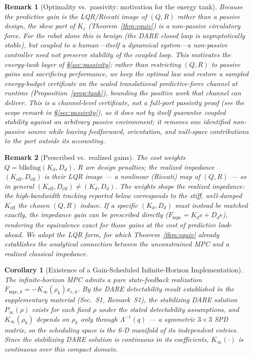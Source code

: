 \documentclass[journal]{IEEEtran}
\newtheorem{corollary}{Corollary}
\newtheorem{remark}{Remark}
\newcommand{\Laminv}{\Lambda^{-1}(q)}
\newcommand{\Fmpc}{F_{\text{mpc}}}
\newcommand{\Fmpck}[1]{F_{\text{mpc},#1}}
\begin{document}
\begin{remark}[Optimality vs.\ passivity: motivation for the energy tank]
Because the predictive gain is the LQR/Riccati image of $(Q,R)$ rather than a
passive design, the skew part of $K_e$ (Theorem~\ref{thm:equiv}) is a
non-passive circulatory force. For the robot alone this is benign (the DARE
closed loop is asymptotically stable), but coupled to a human---itself a
dynamical system---a non-passive controller need not preserve stability of the
\emph{coupled} loop. This motivates the energy-tank layer of
\S\ref{sec:passivity}: rather than restricting $(Q,R)$ to passive gains and
sacrificing performance, we keep the optimal law and restore a sampled
energy-budget certificate on the scaled translational predictive-force
channel at runtime (Proposition~\ref{prop:tank}), bounding the positive work
that channel can deliver. This is a channel-level certificate, not a
full-port passivity proof (see the scope remark in
\S\ref{sec:passivity}), so it does not by itself guarantee coupled
stability against an arbitrary passive environment; it removes one
identified non-passive source while leaving feedforward, orientation, and
null-space contributions to the port outside its accounting.
\end{remark}

\begin{remark}[Prescribed vs.\ realized gains]\label{rem:gains}
The cost weights $Q=\mathrm{blkdiag}(K_d,D_d)$, $R$ are design
\emph{penalties}; the realized impedance
$(K_{\text{eff}},D_{\text{eff}})$ is their LQR image ---
a nonlinear (Riccati) map of $(Q,R)$ --- so in general
$(K_{\text{eff}},D_{\text{eff}})\neq(K_d,D_d)$. The weights \emph{shape}
the realized impedance: the high-bandwidth tracking reported below
corresponds to the stiff, well-damped $K_{\text{eff}}$ the chosen
$(Q,R)$ induce. If a specific $(K_d,D_d)$ must instead be matched
exactly, the impedance gain can be prescribed directly
($\Fmpc=K_de+D_d\dot{e}$), rendering the equivalence exact for those
gains at the cost of predictive look-ahead. We adopt the LQR form, for
which Theorem~\ref{thm:equiv} already establishes the analytical
connection between the unconstrained MPC and a realized classical
impedance.
\end{remark}

\begin{corollary}[Existence of a Gain-Scheduled Infinite-Horizon
Implementation]\label{cor:1khz}
The infinite-horizon MPC admits a pure state-feedback realization
$\Fmpck{k}=-K_\infty(\rho_k)x_{e,k}$. By the DARE detectability result
established in the supplementary material (Sec.~S1, Remark~S1), the
stabilizing DARE solution $P_\infty(\rho)$ exists for each fixed $\rho$
under the stated detectability assumptions, and $K_\infty(\rho_k)$ depends
on $\rho_k$ only through $\Laminv$ --- a symmetric $3\times3$ SPD matrix,
so the scheduling space is the 6-D manifold of its independent entries.
Since the stabilizing DARE solution is continuous in its coefficients,
$K_\infty(\cdot)$ is continuous over this compact domain.
\end{corollary}
\end{document}
